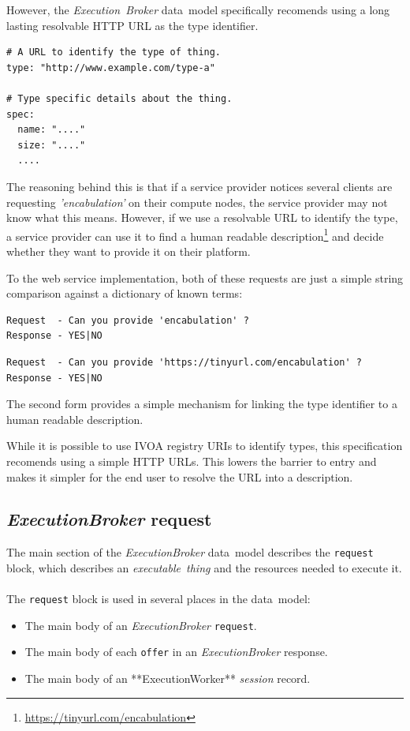 \documentclass[11pt,a4paper]{ivoa}
\newcommand{\datamodel} {data~model}
\newcommand{\webservice} {web service}
\newcommand{\ivoa} {IVOA}
\newcommand{\execworkerclass} {**ExecutionWorker**}
\newcommand{\execbrokerclass} {\textit{ExecutionBroker}}
\newcommand{\executionbroker} {\textit{Execution~Broker}}
\newcommand{\executablething}[1] {\textit{executable~thing#1}}
\newcommand{\workerjob}[1] {\textit{session#1}}
\newcommand{\codeword}[1] {\texttt{#1}}
\newcommand{\footurl}[1] {\footnote{\url{#1}}}
\begin{document}
However, the \executionbroker{} \datamodel{} specifically recomends using a long lasting resolvable
HTTP URL as the type identifier.

\begin{lstlisting}[]
# A URL to identify the type of thing.
type: "http://www.example.com/type-a"

# Type specific details about the thing.
spec:
  name: "...."
  size: "...."
  ....
\end{lstlisting}

The reasoning behind this is that if a service provider notices several clients are requesting
\textit{'encabulation'} on their compute nodes, the service provider may not know what this means.
However, if we use a resolvable URL to identify the type, a service provider can use it to find a
human readable description\footurl{https://tinyurl.com/encabulation} and decide whether they want
to provide it on their platform.

To the \webservice{} implementation, both of these requests are just a simple string comparison against a
dictionary of known terms:

\begin{lstlisting}[]
Request  - Can you provide 'encabulation' ?
Response - YES|NO
\end{lstlisting}

\begin{lstlisting}[]
Request  - Can you provide 'https://tinyurl.com/encabulation' ?
Response - YES|NO
\end{lstlisting}

The second form provides a simple mechanism for linking the type identifier to a human readable description.

While it is possible to use \ivoa{} registry URIs to identify types, this specification
recomends using a simple HTTP URLs. This lowers the barrier to entry and makes it simpler for the end user
to resolve the URL into a description.

\subsection{\execbrokerclass{} request}
\label{datamodel-request}

The main section of the \execbrokerclass{} \datamodel{} describes the \codeword{request} block,
which describes an \executablething{} and the resources needed to execute it.
\\
\\
The \codeword{request} block is used in several places in the \datamodel{}:
\begin{itemize}
    \item The main body of an \execbrokerclass{} \codeword{request}.
    \item The main body of each \codeword{offer} in an \execbrokerclass{} response.
    \item The main body of an \execworkerclass{} \workerjob{} record.
\end{itemize}
\end{document}
